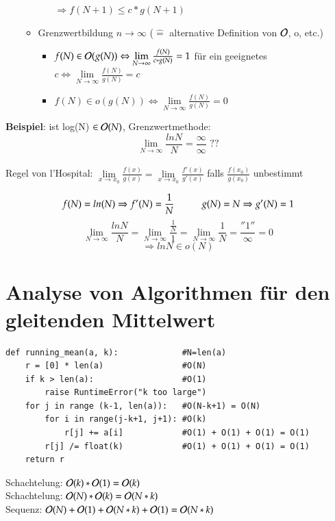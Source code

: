 \begin{itemize}
\begin{itemize}
\begin{enumerate}
                \hspace*{3cm} $\Rightarrow f(N+1) \leq c*g(N+1)$
            \end{enumerate}
            \item Grenzwertbildung $n \rightarrow \infty$ ($\widehat{=}$ alternative Definition von $\mathcal{O}{}$, o, etc.)
            \begin{itemize}[label={}]
                \item $f(N) \in \mathcal{O}{}(g(N)) \Leftrightarrow \lim\limits_{N \rightarrow \infty} \frac{f(N)}{c*g(N)} = 1$ für ein geeignetes $c \Leftrightarrow \lim\limits_{N \rightarrow \infty} \frac{f(N)}{g(N)} = c$
                \item $f(N) \in o(g(N)) \Leftrightarrow \lim\limits_{N \rightarrow \infty} \frac{f(N)}{g(N)} = 0$
            \end{itemize}
        \end{itemize}
    \end{itemize}

\textbf{Beispiel}: ist log(N) $\in \mathcal{O}{}(N)$, Grenzwertmethode:\\
\[\lim\limits_{N\rightarrow\infty} \frac{ln N}{N} = \frac{\infty}{\infty} \text{ ??} \]\\
Regel von l'Hospital: $\lim\limits_{x \rightarrow x_0} \frac{f(x)}{g(x)} = \lim\limits_{x \rightarrow x_0} \frac{f'(x)}{g'(x)}$ falls $\frac{f(x_0)}{g(x_0)}$ unbestimmt

\[f(N) = ln(N) \Rightarrow f'(N) = \frac{1}{N} \hspace*{1cm} g(N) = N \Rightarrow g'(N) = 1 \]
\[\lim_{N \rightarrow \infty} \frac{ln N}{N} = \lim_{N \rightarrow \infty} \frac{\frac{1}{N}}{1} = \lim_{N \rightarrow \infty} \frac{1}{N} =  \frac{''1''}{\infty} = 0  \]
\[ \Rightarrow ln N \in o(N) \]

\section{Analyse von Algorithmen für den gleitenden Mittelwert}
\begin{verbatim}
def running_mean(a, k):             #N=len(a)
    r = [0] * len(a)                #O(N)
    if k > len(a):                  #O(1)
        raise RuntimeError("k too large")
    for j in range (k-1, len(a)):   #O(N-k+1) = O(N)
        for i in range(j-k+1, j+1): #O(k)
            r[j] += a[i]            #O(1) + O(1) + O(1) = O(1)
        r[j] /= float(k)            #O(1) + O(1) + O(1) = O(1)
    return r
\end{verbatim}
Schachtelung: $\mathcal{O}{}(k) * \mathcal{O}{}(1) = \mathcal{O}{}(k)$ \\
Schachtelung: $\mathcal{O}{}(N) * \mathcal{O}{}(k) = \mathcal{O}{}(N*k)$ \\
Sequenz:      $\mathcal{O}{}(N)+\mathcal{O}{}(1)+\mathcal{O}{}(N*k)+\mathcal{O}{}(1) = \mathcal{O}{}(N*k)$ \\

